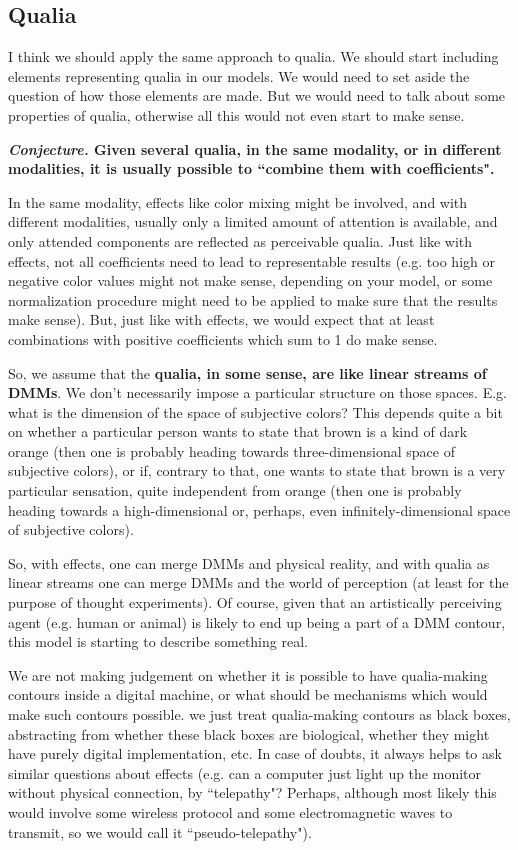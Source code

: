 \documentclass{article}
\begin{document}
\subsection{Qualia}

I think we should apply the same approach to qualia. We should start including elements representing
qualia in our models. We would need to set aside the question of how those elements are made.
But we would need to talk about some properties of qualia, otherwise all this would not even start
to make sense.

{\bf {\em Conjecture.} Given several qualia, in the same modality, or in different modalities, it is usually
possible to ``combine them with coefficients".}

In the same modality, effects like color mixing might be involved, and with different modalities, usually
only a limited amount of attention is available, and only attended components are reflected as 
perceivable qualia. Just like with effects, not all coefficients need to lead to representable results
(e.g. too high or negative color values might not make sense, depending on your model,
or some normalization procedure might need to be applied to make sure that the results
make sense). But, just like with effects, we would expect that at least combinations with
positive coefficients which sum to 1 do make sense.

So, we assume that the {\bf qualia, in some sense, are like linear streams of DMMs}. We don't necessarily
impose a particular structure on those spaces. E.g. what is the dimension of the space of subjective
colors? This depends quite a bit on whether a particular person wants to state that brown is
a kind of dark orange (then one is probably heading towards three-dimensional space of
subjective colors), or if, contrary to that, one wants to state that brown is a very particular sensation,
quite independent from orange (then one is probably heading towards a high-dimensional or,
perhaps, even infinitely-dimensional space of subjective colors).

So, with effects, one can merge DMMs and physical reality, and with qualia as linear streams
one can merge DMMs and the world of perception (at least for the purpose of thought
experiments). Of course, given that an artistically perceiving agent (e.g. human or animal) is likely to end up
being a part of a DMM contour, this model is starting to describe something real.

We are not making judgement on whether it is possible to have qualia-making contours
inside a digital machine, or what should be mechanisms which would make such contours possible.
we just treat qualia-making contours as black boxes, abstracting from whether these black boxes
are biological, whether they might have purely digital implementation, etc. In case of doubts,
it always helps to ask similar questions about effects (e.g. can a computer just light up the monitor
without physical connection, by ``telepathy"? Perhaps, although most likely this would involve some
wireless protocol and some electromagnetic waves to transmit, so we would call it ``pseudo-telepathy").
\end{document}

